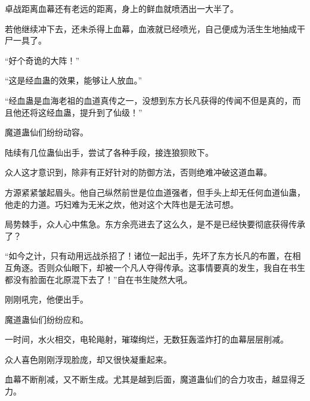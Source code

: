 \begin{this_body}
卓战距离血幕还有老远的距离，身上的鲜血就喷洒出一大半了。

若他继续冲下去，还未杀得上血幕，血液就已经喷光，自己便成为活生生地抽成干尸一具了。

“好个奇诡的大阵！”

“这是经血蛊的效果，能够让人放血。”

“经血蛊是血海老祖的血道真传之一，没想到东方长凡获得的传闻不但是真的，而且他还将这经血蛊，提升到了仙级！”

魔道蛊仙们纷纷动容。

陆续有几位蛊仙出手，尝试了各种手段，接连狼狈败下。

众人这才意识到，除非有正好针对的防御方法，否则绝难冲破这道血幕。

方源紧紧皱起眉头。他自己纵然前世是位血道强者，但手头上却无任何血道仙蛊，他走的力道。巧妇难为无米之炊，他对这个大阵也是无法可想。

局势棘手，众人心中焦急。东方余亮进去了这么久，是不是已经快要彻底获得传承了？

“如今之计，只有动用远战杀招了！诸位一起出手，先坏了东方长凡的布置，在相互角逐。否则众仙眼下，却被一个凡人夺得传承。这事情要真的发生，我自在书生都没有脸面在北原混下去了！”自在书生陡然大吼。

刚刚吼完，他便出手。

魔道蛊仙们纷纷应和。

一时间，水火相交，电轮飚射，璀璨绚烂，无数狂轰滥炸打的血幕层层削减。

众人喜色刚刚浮现脸庞，却又很快凝重起来。

血幕不断削减，又不断生成。尤其是越到后面，魔道蛊仙们的合力攻击，越显得乏力。

\end{this_body}

